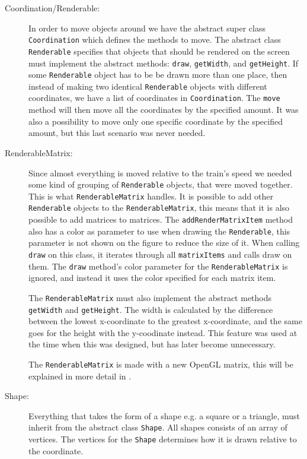 \begin{description}
\item[Coordination/Renderable:] In order to move objects around we have the abstract super class \lstinline|Coordination| which defines the methods to move. The abstract class \lstinline|Renderable| specifies that objects that should be rendered on the screen must implement the abstract methods: \lstinline|draw|, \lstinline|getWidth|, and \lstinline|getHeight|. If some \lstinline|Renderable| object has to be be drawn more than one place, then instead of making two identical \lstinline|Renderable| objects with different coordinates, we have a list of coordinates in \lstinline|Coordination|. The \lstinline|move| method will then move all the coordinates by the specified amount. It was also a possibility to move only one specific coordinate by the specified amount, but this last scenario was never needed.

\item[RenderableMatrix:] Since almost everything is moved relative to the train's speed we needed some kind of grouping of \lstinline|Renderable| objects, that were moved together. This is what \lstinline|RenderableMatrix| handles. It is possible to add other \lstinline|Renderable| objects to the \lstinline|RenderableMatrix|, this means that it is also possible to add matrices to matrices. The \lstinline|addRenderMatrixItem| method also has a color as parameter to use when drawing the \lstinline|Renderable|, this parameter is not shown on the figure to reduce the size of it. When calling \lstinline|draw| on this class, it iterates through all \lstinline|matrixItems| and calls draw on them. The \lstinline|draw| method's color parameter for the \lstinline|RenderableMatrix| is ignored, and instead it uses the color specified for each matrix item.

The \lstinline|RenderableMatrix| must also implement the abstract methods \lstinline|getWidth| and \lstinline|getHeight|. The width is calculated by the difference between the lowest x-coordinate to the greatest x-coordinate, and the same goes for the height with the y-coodinate instead. This feature was used at the time when this was designed, but has later become unnecessary.

The \lstinline|RenderableMatrix| is made with a new OpenGL matrix, this will be explained in more detail in .

\item[Shape:] Everything that takes the form of a shape e.g. a square or a triangle, must inherit from the abstract class \lstinline|Shape|. All shapes consists of an array of vertices. The vertices for the \lstinline|Shape| determines how it is drawn relative to the coordinate.


\end{description}
